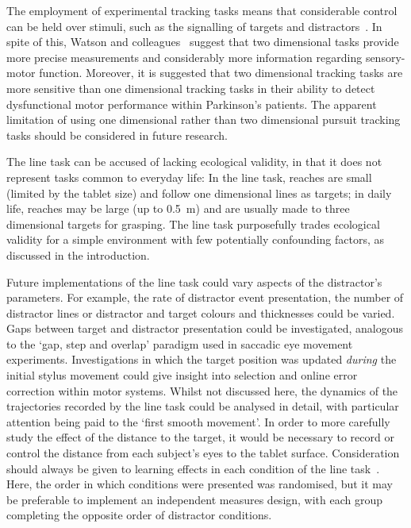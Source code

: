 \documentclass[10pt,letterpaper]{article}
\begin{document}
The employment of experimental tracking tasks means that considerable
control can be held over stimuli, such as the signalling of targets
and distractors~\cite{watson_two-dimensional_1997}. In spite of this,
Watson and colleagues~\cite{watson_two-dimensional_1997} suggest that
two dimensional tasks provide more precise measurements and
considerably more information regarding sensory-motor function.
Moreover, it is suggested that two dimensional tracking tasks are more
sensitive than one dimensional tracking tasks in their ability to
detect dysfunctional motor performance within Parkinson's
patients. The apparent limitation of using one dimensional
rather than two dimensional pursuit tracking tasks should be
considered in future research.

The line task can be accused of lacking ecological validity, in
that it does not represent tasks common to everyday life: In the line
task, reaches are small (limited by the tablet size) and follow one
dimensional lines as targets; in daily life, reaches may be large (up
to 0.5~m) and are usually made to three dimensional targets for
grasping. The line task purposefully trades ecological validity for a
simple environment with few potentially confounding factors, as
discussed in the introduction.

Future implementations of the line task could vary aspects of the
distractor's parameters. For example, the rate of distractor event
presentation, the number of distractor lines or distractor and target
colours and thicknesses could be varied. Gaps between target and
distractor presentation could be investigated, analogous to the `gap,
step and overlap' paradigm used in saccadic eye movement
experiments. Investigations in which the target position was updated
\emph{during} the initial stylus movement could give insight into
selection and online error correction within motor systems. Whilst not
discussed here, the dynamics of the trajectories recorded by the line
task could be analysed in detail, with particular attention being paid
to the `first smooth movement'. In order to more carefully study the
effect of the distance to the target, it would be necessary to record
or control the distance from each subject's eyes to the tablet
surface. Consideration should always be given to learning effects in
each condition of the line task~\cite{song_automatic_2007}. Here, the
order in which conditions were presented was randomised, but it may be
preferable to implement an independent measures design, with each
group completing the opposite order of distractor conditions.
\end{document}
